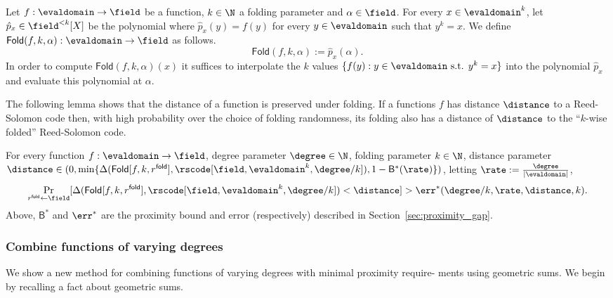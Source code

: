 \begin{definition}\label{def:fn_folding}
Let $f:\evaldomain\rightarrow\field$ be a function, $k\in\N$ a folding parameter and $\alpha\in\field$. For every $x\in{\evaldomain}^k$, let $\hat{p}_x\in\field^{<k}[X]$ be the polynomial where $\hat{p}_x(y)=f(y)$ for every $y\in{\evaldomain}$ such that $y^k=x$. We define $\mathsf{Fold}(f,k,\alpha):\evaldomain\rightarrow\field$ as follows.
\[
    \mathsf{Fold}(f,k,\alpha):=\hat{p}_x(\alpha).
\]
In order to compute $\mathsf{Fold}(f,k,\alpha)(x)$ it suffices to interpolate the $k$ values $\{f(y):y\in\evaldomain\text{ s.t. }y^k=x\}$ into the polynomial $\hat{p}_x$ and evaluate this polynomial at $\alpha$.
\end{definition}

The following lemma shows that the distance of a function is preserved under folding. If a functions $f$ has distance $\distance$ to a Reed-Solomon code then, with high probability over the choice of folding randomness, its folding also has a distance of $\distance$ to the ``$k$-wise folded'' Reed-Solomon code.

\begin{lemma}\label{lemma:folding}
    For every function $f:\evaldomain\rightarrow\field$, degree parameter $\degree\in\N$, folding parameter $k\in\N$, distance parameter $\distance\in(0,\min\{{\Delta(\mathsf{Fold}[f,k,r^{\mathsf{fold}}],\rscode[\field,{\evaldomain}^k, \degree/k]),1-{\mathsf{B}}^*(\rate)}\})$, letting $\rate:=\frac{\degree}{|\evaldomain|}$,
    \[
        \Pr_{r^{\mathsf{fold}}\gets\field}[\Delta(\mathsf{Fold}[f,k,r^{\mathsf{fold}}],\rscode[\field,{\evaldomain}^k, \degree/k])<\distance]>\err^*(\degree/k,\rate,\distance,k).
    \]
    Above, ${\mathsf{B}}^*$ and ${\err}^*$ are the proximity bound and error (respectively) described in Section~\ref{sec:proximity_gap}.
\end{lemma}

\subsubsection{Combine functions of varying degrees}\label{sec:combine}
We show a new method for combining functions of varying degrees with minimal proximity require- ments using geometric sums. We begin by recalling a fact about geometric sums.

